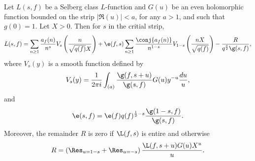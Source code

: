       \begin{theorem}
        Let $L(s,f)$ be a Selberg class $L$-function and $G(u)$ be an even holomorphic function bounded on the strip $|\Re(u)| < a$, for any $a > 1$, and such that $g(0) = 1$. Let $X > 0$. Then for $s$ in the critial strip,
        \[
          L(s,f) = \sum_{n \ge 1}\frac{a_{f}(n)}{n^{s}}V_{s}\left(\frac{n}{\sqrt{q(f)}X}\right)+\e(f,s)\sum_{n \ge 1}\frac{\conj{a_{f}(n)}}{n^{1-s}}V_{1-s}\left(\frac{nX}{\sqrt{q(f)}}\right)-\frac{R}{q^{\frac{s}{2}}\g(s,f)},
        \]
        where $V_{s}(y)$ is a smooth function defined by
        \[
          V_{s}(y) = \frac{1}{2\pi i}\int_{(a)}\frac{\g(f,s+u)}{\g(s,f)}G(u)y^{-u}\frac{du}{u},
        \]
        and
        \[
          \e(s,f) = \e(f)q(f)^{\frac{1}{2}-s}\frac{\g(1-s,f)}{\g(s,f)}.
        \]
        Moreover, the remainder $R$ is zero if $\L(f,s)$ is entire and otherwise
        \[
          R = \left(\Res_{u = 1-s}+\Res_{u = -s}\right)\frac{\L(f,s+u)G(u)X^{u}}{u}.
        \]
      \end{theorem}
